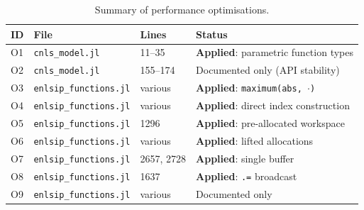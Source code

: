 \documentclass[11pt, a4paper]{article}
\begin{document}
\begin{table}[ht]
\centering
\caption{Summary of performance optimisations.}
\label{tab:optim}
\small
\begin{tabular}{@{}lllp{6.5cm}@{}}
\toprule
\textbf{ID} & \textbf{File} & \textbf{Lines} & \textbf{Status} \\
\midrule
O1 & \texttt{cnls\_model.jl}       & 11--35  & \textbf{Applied}: parametric function types \\
O2 & \texttt{cnls\_model.jl}       & 155--174 & Documented only (API stability) \\
O3 & \texttt{enlsip\_functions.jl} & various & \textbf{Applied}: \texttt{maximum(abs, $\cdot$)} \\
O4 & \texttt{enlsip\_functions.jl} & various & \textbf{Applied}: direct index construction \\
O5 & \texttt{enlsip\_functions.jl} & 1296    & \textbf{Applied}: pre-allocated workspace \\
O6 & \texttt{enlsip\_functions.jl} & various & \textbf{Applied}: lifted allocations \\
O7 & \texttt{enlsip\_functions.jl} & 2657, 2728 & \textbf{Applied}: single buffer \\
O8 & \texttt{enlsip\_functions.jl} & 1637    & \textbf{Applied}: \texttt{.=} broadcast \\
O9 & \texttt{enlsip\_functions.jl} & various & Documented only \\
\bottomrule
\end{tabular}
\end{table}
\end{document}
